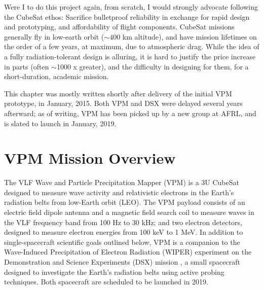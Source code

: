 Were I to do this project again, from scratch, I would strongly advocate following the CubeSat ethos: Sacrifice bulletproof reliability in exchange for rapid design and prototyping, and affordability of flight components. CubeSat missions generally fly in low-earth orbit ($\sim 400$ km altitude), and have mission lifetimes on the order of a few years, at maximum, due to atmospheric drag. While the idea of a fully radiation-tolerant design is alluring, it is hard to justify the price increase in parts (often $\sim$1000 x greater), and the difficulty in designing for them, for a short-duration, academic mission.

This chapter was mostly written shortly after delivery of the initial VPM prototype, in January, 2015. Both VPM and DSX were delayed several years afterward; as of writing, VPM has been picked up by a new group at AFRL, and is slated to launch in January, 2019.

\section{VPM Mission Overview}
The VLF Wave and Particle Precipitation Mapper (VPM) is a 3U CubeSat designed to measure wave activity and relativistic electrons in the Earth's radiation belts from low-Earth orbit (LEO). The VPM payload consists of an electric field dipole antenna and a magnetic field search coil to measure waves in the VLF frequency band from 100 Hz to 30 kHz; and two electron detectors, designed to measure electron energies from 100 keV to 1 MeV. In addition to single-spacecraft scientific goals outlined below, VPM is a companion to the Wave-Induced Precipitation of Electron Radiation (WIPER) experiment on the Demonstration and Science Experiments (DSX) mission \citep{Schoenberg2006, Spanjers2006}, a small spacecraft designed to investigate the Earth's radiation belts using active probing techniques. Both spacecraft are scheduled to be launched in 2019.

